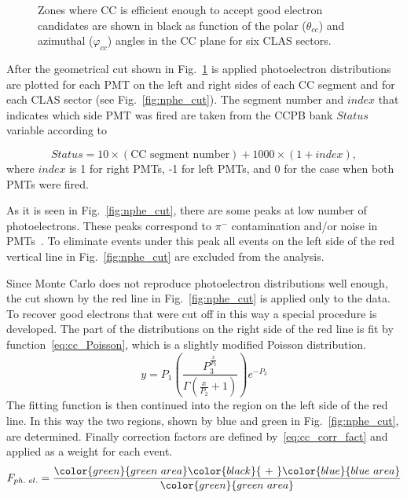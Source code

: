 \begin{figure}[htp]
\begin{center}
\caption{\small  Zones where CC is efficient enough to accept good electron candidates are shown in black as function of the polar ($\theta_{cc}$) and azimuthal ($\varphi_{cc}$) angles in the CC plane for six CLAS sectors. } \label{fig:ph_vs_th_cc_08cut}
\end{center}
\end{figure}

After the geometrical cut shown in Fig.~\ref{fig:ph_vs_th_cc_08cut} is applied photoelectron distributions are plotted for each PMT on the left and right sides of each CC segment and for each CLAS sector (see Fig.~\ref{fig:nphe_cut}). The segment number and $index$ that indicates which side PMT was fired are taken from the  CCPB bank $Status$ variable according to

\begin{equation}
Status = 10\times(\text{CC segment number}) + 1000\times( 1 + index),
\label{eq:cc_segment}
\end{equation}
where $index$ is 1 for right PMTs, -1 for left PMTs, and 0 for the case when both PMTs were fired.

As it is seen in Fig.~\ref{fig:nphe_cut}, there are some peaks at low number of photoelectrons. These peaks correspond to $\pi^{-}$ contamination and/or noise in PMTs~\cite{Osipenko:2004}. To eliminate events under this peak all events on the left side of the red vertical line in Fig.~\ref{fig:nphe_cut} are excluded from the analysis.

Since Monte Carlo does not reproduce photoelectron distributions well enough, the cut shown by the red line in Fig.~\ref{fig:nphe_cut} is applied only to the data. To recover good electrons that were cut off in this way a special procedure is developed. The part of the distributions on the right side of the red line is fit by function~\ref{eq:cc_Poisson}, which is a slightly modified Poisson distribution. 
\begin{equation}
y = P_{1}\left(\frac{P_{3}^{\frac{x}{P_{2}}}}{\Gamma\left(\frac{x}{P_{2}}+1\right)}
\right)e^{-P_{3}}
\label{eq:cc_Poisson}
\end{equation}
The fitting function is then continued into the region on the left side of the red line. In this way the two regions, shown by blue and green in Fig.~\ref{fig:nphe_cut}, are determined. Finally correction factors are defined by~\ref{eq:cc_corr_fact} and applied as a weight for each event.
\begin{equation}
F_{ph.\,\, el.} = \frac{\color{green}{green\,\,  area} \color{black}{\,\,+\,\,} \color{blue}{blue\,\,  area}}{\color{green}{green\,\,  area}}
\label{eq:cc_corr_fact}
\end{equation}

